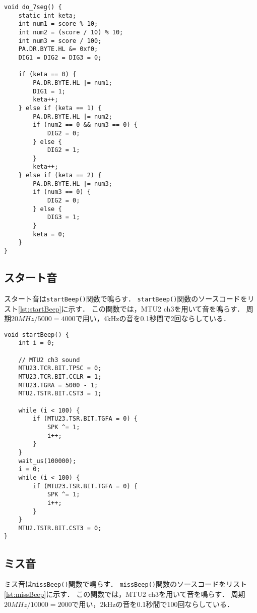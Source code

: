 \documentclass[a4paper,11pt,dvipdfmx]{jsarticle}
\begin{document}
\begin{lstlisting}[caption=do\_7seg(), label=lst:do_7seg]
  void do_7seg() {
    static int keta;
    int num1 = score % 10;
    int num2 = (score / 10) % 10;
    int num3 = score / 100;
    PA.DR.BYTE.HL &= 0xf0;
    DIG1 = DIG2 = DIG3 = 0;

    if (keta == 0) {
        PA.DR.BYTE.HL |= num1;
        DIG1 = 1;
        keta++;
    } else if (keta == 1) {
        PA.DR.BYTE.HL |= num2;
        if (num2 == 0 && num3 == 0) {
            DIG2 = 0;
        } else {
            DIG2 = 1;
        }
        keta++;
    } else if (keta == 2) {
        PA.DR.BYTE.HL |= num3;
        if (num3 == 0) {
            DIG2 = 0;
        } else {
            DIG3 = 1;
        }
        keta = 0;
    }
}
\end{lstlisting}

\subsection{スタート音}
スタート音は\texttt{startBeep()}関数で鳴らす．
\texttt{startBeep()}関数のソースコードをリスト\ref{lst:startBeep}に示す．
この関数では，MTU2 ch3を用いて音を鳴らす．
周期$20MHz / 5000 = 4000$で用い，4kHzの音を0.1秒間で2回ならしている．


\begin{lstlisting}[caption=startBeep(), label=lst:startBeep]
  void startBeep() {
    int i = 0;

    // MTU2 ch3 sound
    MTU23.TCR.BIT.TPSC = 0;
    MTU23.TCR.BIT.CCLR = 1;
    MTU23.TGRA = 5000 - 1;
    MTU2.TSTR.BIT.CST3 = 1;

    while (i < 100) {
        if (MTU23.TSR.BIT.TGFA = 0) {
            SPK ^= 1;
            i++;
        }
    }
    wait_us(100000);
    i = 0;
    while (i < 100) {
        if (MTU23.TSR.BIT.TGFA = 0) {
            SPK ^= 1;
            i++;
        }
    }
    MTU2.TSTR.BIT.CST3 = 0;
}
\end{lstlisting}

\subsection{ミス音}

ミス音は\texttt{missBeep()}関数で鳴らす．
\texttt{missBeep()}関数のソースコードをリスト\ref{lst:missBeep}に示す．
この関数では，MTU2 ch3を用いて音を鳴らす．
周期$20MHz / 10000 = 2000$で用い，2kHzの音を0.1秒間で100回ならしている．
\end{document}
